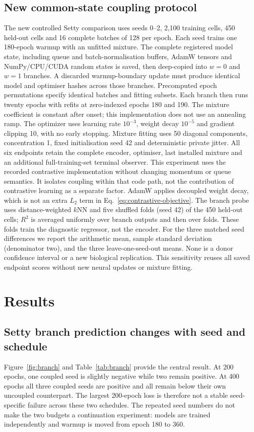 \documentclass[11pt]{article}
\begin{document}
\subsection{New common-state coupling protocol}
The new controlled Setty comparison uses seeds 0--2, 2,100 training cells,
450 held-out cells and 16 complete batches of 128 per epoch. Each seed
trains one 180-epoch warmup with an unfitted mixture. The complete registered
model state, including queue and batch-normalisation buffers, AdamW tensors
and NumPy/CPU/CUDA random states is saved, then deep-copied into $w=0$ and
$w=1$ branches. A discarded warmup-boundary update must produce identical
model and optimiser hashes across those branches. Precomputed epoch
permutations specify identical batches and fitting subsets. Each branch
then runs twenty epochs with refits at zero-indexed epochs 180 and 190.
The mixture coefficient is constant after onset; this implementation does
not use an annealing ramp. The optimizer uses learning rate $10^{-3}$,
weight decay $10^{-5}$ and gradient clipping 10, with no early stopping.
Mixture fitting uses 50 diagonal components, concentration 1, fixed
initialisation seed 42 and deterministic private jitter. All six endpoints
retain the complete encoder, optimiser, last installed mixture and an
additional full-training-set terminal observer. This experiment uses the
recorded contrastive implementation without changing momentum or queue
semantics. It isolates coupling within that code path, not the contribution
of contrastive learning as a separate factor.
AdamW applies decoupled weight decay\cite{loshchilov2019decoupled},
which is not an extra $L_2$ term in Eq.~\ref{eq:contrastive-objective}.
The branch probe uses distance-weighted $k$NN and five shuffled folds
(seed 42) of the 450 held-out cells; $R^2$ is averaged uniformly over
branch outputs and then over folds. These folds train the diagnostic
regressor, not the encoder. For the three matched seed differences we
report the arithmetic mean, sample standard deviation (denominator two),
and the three leave-one-seed-out means. None is a donor confidence
interval or a new biological replication. This sensitivity reuses all
saved endpoint scores without new neural updates or mixture fitting.

\section{Results}
\subsection{Setty branch prediction changes with seed and schedule}
Figure~\ref{fig:branch} and Table~\ref{tab:branch} provide the central result.
At 200 epochs, one coupled seed is slightly negative while two remain positive.
At 400 epochs all three coupled seeds are positive and all remain below their
own uncoupled counterpart. The largest 200-epoch loss is therefore not a
stable seed-specific failure across these two schedules. The repeated seed
numbers do not make the two budgets a continuation experiment: models are
trained independently and warmup is moved from epoch 180 to 360.
\end{document}
